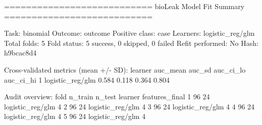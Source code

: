\begin{CodeOutput}
===========================
 bioLeak Model Fit Summary
===========================

Task: binomial
Outcome: outcome
Positive class: case
Learners: logistic_reg/glm
Total folds: 5
Fold status: 5 success, 0 skipped, 0 failed
Refit performed: No
Hash: h9bcac8d4

Cross-validated metrics (mean +/- SD):
           learner auc_mean auc_sd auc_ci_lo auc_ci_hi
1 logistic_reg/glm    0.584  0.118     0.364     0.804

Audit overview:
 fold n_train n_test          learner features_final
    1      96     24 logistic_reg/glm              4
    2      96     24 logistic_reg/glm              4
    3      96     24 logistic_reg/glm              4
    4      96     24 logistic_reg/glm              4
    5      96     24 logistic_reg/glm              4
\end{CodeOutput}
